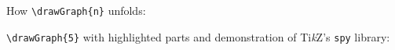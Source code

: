 \documentclass{tixtex}
\newcommand\drawGraph[1]{ %
    \graphdepth #1\relax
    \path (0,0) coordinate (cur\the\graphdepth);
    \drawGraphElement[180,90,0,-90]
}
\newcommand\drawGraphElement[1][90,0,-90]{%
    \ifnum\graphdepth > 0%
        \foreach \angle in {#1}
        {
            \begin{scope}[rotate=\angle]
                \pgfmathparse{\curLen*(1-\recFactor)}
                \draw (cur\the\graphdepth) -- +(\pgfmathresult,0) 
                    coordinate (tmp) ;
                \advance\graphdepth -1\relax
                \path (tmp) coordinate (cur\the\graphdepth) ;
                \adjustRecFactor
                \pgfmathsetmacro\curLen{\curLen*\recFactor}
                \drawGraphElement
            \end{scope}
        
        }
    \else %
        \draw (cur\the\graphdepth) -- +(\curLen,0) ;
    \fi
}
\let\adjustRecFactor=\relax
\begin{document}
How \verb|\drawGraph{n}| unfolds:
\begin{center}
    \pgfmathsetmacro{}
    \pgfmathsetmacro{}
\end{center}

\vspace{1cm}

\verb|\drawGraph{5}| with highlighted parts and demonstration of
Ti\textit{k}Z's \texttt{spy} library:
\end{document}
